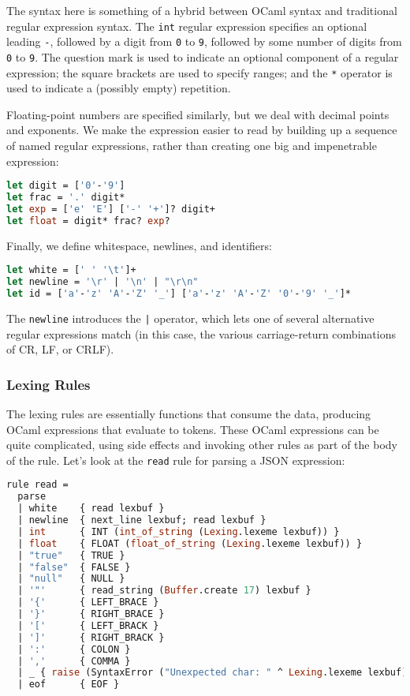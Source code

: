 The syntax here is something of a hybrid between OCaml syntax and
traditional regular expression syntax. The \passthrough{\lstinline!int!}
regular expression specifies an optional leading
\passthrough{\lstinline!-!}, followed by a digit from
\passthrough{\lstinline!0!} to \passthrough{\lstinline!9!}, followed by
some number of digits from \passthrough{\lstinline!0!} to
\passthrough{\lstinline!9!}. The question mark is used to indicate an
optional component of a regular expression; the square brackets are used
to specify ranges; and the \passthrough{\lstinline!*!} operator is used
to indicate a (possibly empty) repetition.

Floating-point numbers are specified similarly, but we deal with decimal
points and exponents. We make the expression easier to read by building
up a sequence of named regular expressions, rather than creating one big
and impenetrable expression:

\begin{lstlisting}[language=Caml]
let digit = ['0'-'9']
let frac = '.' digit*
let exp = ['e' 'E'] ['-' '+']? digit+
let float = digit* frac? exp?
\end{lstlisting}

Finally, we define whitespace, newlines, and identifiers:

\begin{lstlisting}[language=Caml]
let white = [' ' '\t']+
let newline = '\r' | '\n' | "\r\n"
let id = ['a'-'z' 'A'-'Z' '_'] ['a'-'z' 'A'-'Z' '0'-'9' '_']*
\end{lstlisting}

The \passthrough{\lstinline!newline!} introduces the
\passthrough{\lstinline!|!} operator, which lets one of several
alternative regular expressions match (in this case, the various
carriage-return combinations of CR, LF, or CRLF).

\hypertarget{lexing-rules}{%
\subsubsection{Lexing Rules}\label{lexing-rules}}

The lexing rules are essentially functions that consume the data,
producing OCaml expressions that evaluate to tokens. These OCaml
expressions can be quite complicated, using side effects and invoking
other rules as part of the body of the rule. Let's look at the
\passthrough{\lstinline!read!} rule for parsing a JSON expression:

\begin{lstlisting}[language=Caml]
rule read =
  parse
  | white    { read lexbuf }
  | newline  { next_line lexbuf; read lexbuf }
  | int      { INT (int_of_string (Lexing.lexeme lexbuf)) }
  | float    { FLOAT (float_of_string (Lexing.lexeme lexbuf)) }
  | "true"   { TRUE }
  | "false"  { FALSE }
  | "null"   { NULL }
  | '"'      { read_string (Buffer.create 17) lexbuf }
  | '{'      { LEFT_BRACE }
  | '}'      { RIGHT_BRACE }
  | '['      { LEFT_BRACK }
  | ']'      { RIGHT_BRACK }
  | ':'      { COLON }
  | ','      { COMMA }
  | _ { raise (SyntaxError ("Unexpected char: " ^ Lexing.lexeme lexbuf)) }
  | eof      { EOF }
\end{lstlisting}

